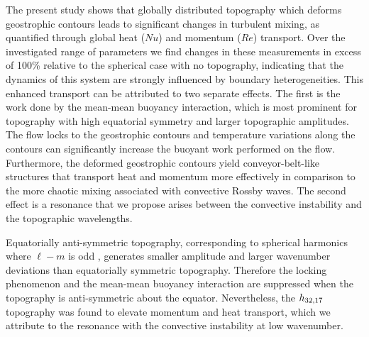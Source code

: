 The present study shows that globally distributed topography which deforms geostrophic contours leads to significant changes in turbulent mixing, as quantified through global heat ($Nu$) and momentum ($Re$) transport. 
Over the investigated range of parameters we find changes in these measurements in excess of 100\% relative to the spherical case with no topography, indicating that the dynamics of this system are strongly influenced by boundary heterogeneities. 
This enhanced transport can be attributed to two separate effects. 
The first is the work done by the mean-mean buoyancy interaction, which is most prominent for topography with high equatorial symmetry and larger topographic amplitudes. 
The flow locks to the geostrophic contours and temperature variations along the contours can significantly increase the buoyant work performed on the flow. Furthermore, the deformed geostrophic contours yield conveyor-belt-like structures that transport heat and momentum more effectively in comparison to the more chaotic mixing associated with convective Rossby waves.
The second effect is a resonance that we propose arises between the convective instability and the topographic wavelengths. 


Equatorially anti-symmetric topography, corresponding to spherical harmonics where $\ell-m$ is odd , generates smaller amplitude and larger wavenumber deviations  than equatorially symmetric topography.
Therefore the locking phenomenon and the mean-mean buoyancy interaction are suppressed when the topography is anti-symmetric about the equator.
Nevertheless, the $h_{32,17}$ topography was found to elevate momentum and heat transport, which we attribute to the resonance with the convective instability at low wavenumber.




